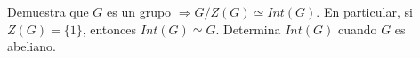 \question
Demuestra que $G$ es un grupo $\Rightarrow {G/Z(G) \simeq Int(G)}$. 
En particular, si $Z(G) = \{1\}$, entonces $Int(G) \simeq G$. 
Determina $Int(G)$ cuando $G$ es abeliano.